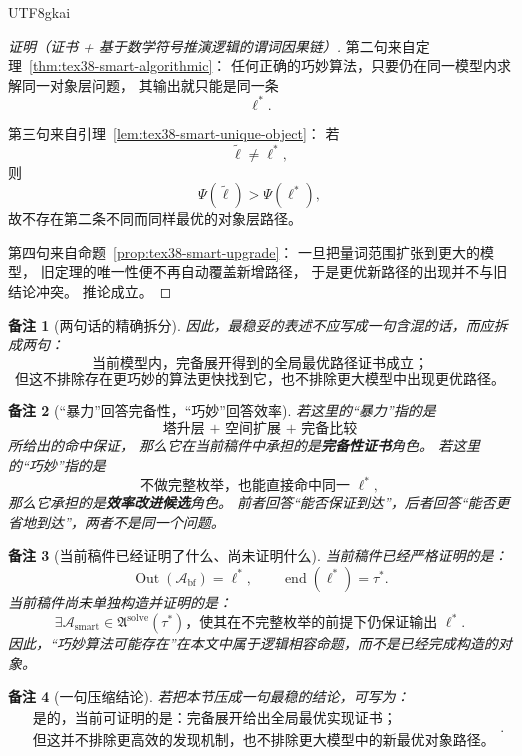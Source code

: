 \documentclass[12pt]{article}
\newtheorem{remark}{备注}[section]
\begin{document}
\begin{CJK*}{UTF8}{gkai}
\begin{proof}[证明（证书 + 基于数学符号推演逻辑的谓词因果链）]
第二句来自定理~\ref{thm:tex38-smart-algorithmic}：
任何正确的巧妙算法，只要仍在同一模型内求解同一对象层问题，
其输出就只能是同一条
\[
  \ell^\ast.
\]

第三句来自引理~\ref{lem:tex38-smart-unique-object}：
若
\[
  \widetilde\ell\neq\ell^\ast,
\]
则
\[
  \Psi(\widetilde\ell)>\Psi(\ell^\ast),
\]
故不存在第二条不同而同样最优的对象层路径。

第四句来自命题~\ref{prop:tex38-smart-upgrade}：
一旦把量词范围扩张到更大的模型，
旧定理的唯一性便不再自动覆盖新增路径，
于是更优新路径的出现并不与旧结论冲突。
推论成立。
\end{proof}

\begin{remark}[两句话的精确拆分]
因此，最稳妥的表述不应写成一句含混的话，而应拆成两句：
\[
  \text{当前模型内，完备展开得到的全局最优路径证书成立；}
\]
\[
  \text{但这不排除存在更巧妙的算法更快找到它，也不排除更大模型中出现更优路径。}
\]
\end{remark}

\begin{remark}[“暴力”回答完备性，“巧妙”回答效率]
若这里的“暴力”指的是
\[
  \text{塔升层 + 空间扩展 + 完备比较}
\]
所给出的命中保证，
那么它在当前稿件中承担的是\textbf{完备性证书}角色。
若这里的“巧妙”指的是
\[
  \text{不做完整枚举，也能直接命中同一 }\ell^\ast,
\]
那么它承担的是\textbf{效率改进候选}角色。
前者回答“能否保证到达”，后者回答“能否更省地到达”，两者不是同一个问题。
\end{remark}

\begin{remark}[当前稿件已经证明了什么、尚未证明什么]
当前稿件已经严格证明的是：
\[
  \operatorname{Out}(\mathcal A_{\mathrm{bf}})=\ell^\ast,
  \qquad
  \operatorname{end}(\ell^\ast)=\tau^\ast.
\]
当前稿件尚未单独构造并证明的是：
\[
  \exists \mathcal A_{\mathrm{smart}}
  \in
  \mathfrak A^{\mathrm{solve}}(\tau^\ast)
  \text{，使其在不完整枚举的前提下仍保证输出 }\ell^\ast.
\]
因此，“巧妙算法可能存在”在本文中属于逻辑相容命题，而不是已经完成构造的对象。
\end{remark}

\begin{remark}[一句压缩结论]
若把本节压成一句最稳的结论，可写为：
\[
  \boxed{
    \begin{aligned}
      &\text{是的，当前可证明的是：完备展开给出全局最优实现证书；}\\
      &\text{但这并不排除更高效的发现机制，也不排除更大模型中的新最优对象路径。}
    \end{aligned}
  }.
\]
\end{remark}


\end{CJK*}
\end{document}
